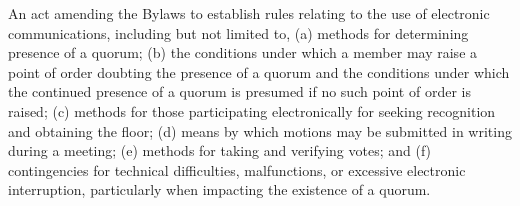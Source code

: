 \begin{bylaws-number}
\begin{bylaws-number}
    \item An act amending the Bylaws to establish rules relating to the use of electronic communications, including but not limited to, (a) methods for determining presence of a quorum; (b) the conditions under which a member may raise a point of order doubting the presence of a quorum and the conditions under which the continued presence of a quorum is presumed if no such point of order is raised; (c) methods for those participating electronically for seeking recognition and obtaining the floor; (d) means by which motions may be submitted in writing during a meeting; (e) methods for taking and verifying votes; and (f) contingencies for technical difficulties, malfunctions, or excessive electronic interruption, particularly when impacting the existence of a quorum.
  \end{bylaws-number}
\end{bylaws-number}
